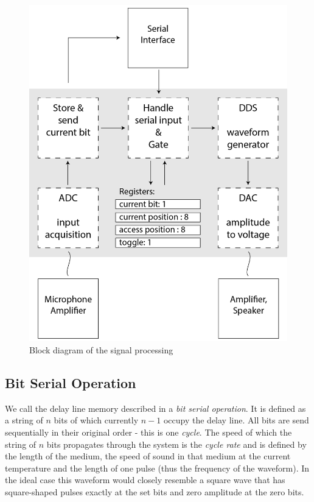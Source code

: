 \documentclass[10pt,a4paper,twocolumn]{article}
\begin{document}
\begin{figure}
\centering
\includegraphics[width=\columnwidth]{delay line dsp-01.png} 
\caption{Block diagram of the signal processing}
\label{fig:dsp}
\end{figure}

\subsection{Bit Serial Operation}\label{bitserial}
We call the delay line memory described in \cite{auerbach} a \emph{bit serial operation}. It is defined as a string of $n$ bits of which currently $n-1$ occupy the delay line. All bits are send sequentially in their original order - this is one \emph{cycle}. The speed of which the string of $n$ bits propagates through the system is the \emph{cycle rate} and is defined by the length of the medium, the speed of sound in that medium at the current temperature and the length of one pulse (thus the frequency of the waveform). In the ideal case this waveform would closely resemble a square wave that has square-shaped pulses exactly at the set bits and zero amplitude at the zero bits. 
\end{document}

